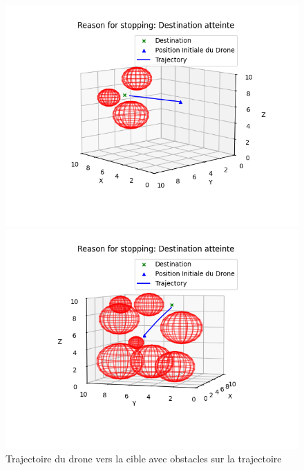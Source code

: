 \documentclass[a4paper, 12pt]{article}
\begin{document}
\begin{figure}[H]
    \centering
    \begin{minipage}{0.49\textwidth}
        \centering
        \includegraphics[width=\textwidth]{Figure_7.png}
    \end{minipage}
    \hfill
    \begin{minipage}{0.49\textwidth}
        \centering
        \includegraphics[width=\textwidth]{Figure_8.png}
    \end{minipage}
    \caption{Trajectoire du drone vers la cible avec obstacles sur la trajectoire}
\end{figure}
\end{document}
